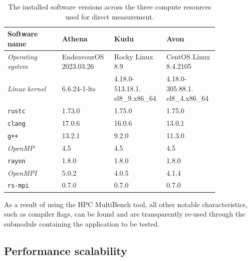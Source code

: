 \begin{table}[H]
    \caption{The installed software versions across the three compute resources used for direct measurement.}
    \label{table:compute-resource-software-versions}
    \begin{tabular}{|p{0.24\linewidth}||p{0.2\linewidth}|p{0.2\linewidth}|p{0.2\linewidth}|}
    \hline
    \textbf{Software name} & \textbf{Athena} & \textbf{Kudu} & \textbf{Avon} \\
    \hline\hline
    \textit{Operating system} & EndeavourOS 2023.03.26 & Rocky Linux 8.9                & CentOS Linux 8.4.2105          \\\hline
    \textit{Linux kernel}     & 6.6.24-1-lts                     & 4.18.0-513.18.1. el8\_9.x86\_64 & 4.18.0-305.88.1. el8\_4.x86\_64 \\\hline
    \texttt{rustc}            & 1.73.0                           & 1.75.0                         & 1.75.0                         \\\hline
    \texttt{clang}            & 17.0.6                           & 16.0.6                         & 13.0.1                         \\\hline
    \texttt{g++}              & 13.2.1                           & 9.2.0                          & 11.3.0                         \\\hline
    \textit{OpenMP}           & 4.5                              & 4.5                            & 4.5                            \\\hline
    \texttt{rayon}            & 1.8.0                            & 1.8.0                          & 1.8.0                          \\\hline
    \textit{OpenMPI}          & 5.0.2                            & 4.0.5                          & 4.1.4                          \\\hline
    \texttt{rs-mpi}           & 0.7.0                            & 0.7.0                          & 0.7.0                          \\\hline
    \end{tabular}
\end{table}

As a result of using the HPC MultiBench tool, all other notable characteristics, such as compiler flags, can be found and are transparently re-used through the submodule containing the application to be tested.

\subsection{Performance scalability}
\label{ssec:performance-scalability}


